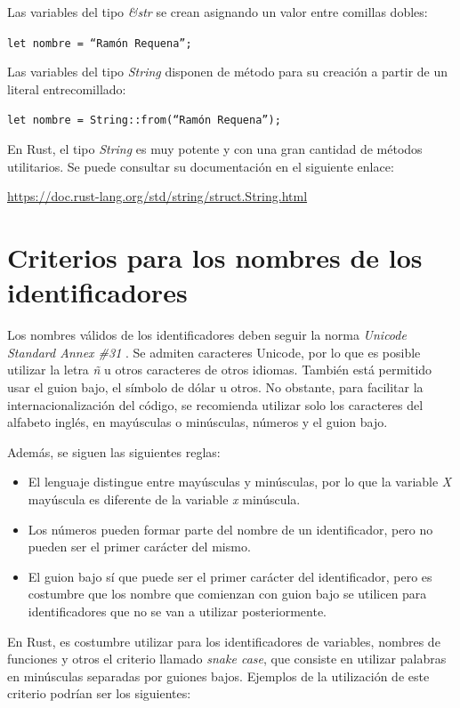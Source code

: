Las variables del tipo \textit{\&str} se crean asignando un valor entre comillas dobles:

{\centering \texttt{let nombre = ``Ramón Requena'';} \par}

Las variables del tipo \textit{String} disponen de método para su creación a partir de un literal entrecomillado:

{\centering \texttt{let nombre = String::from(``Ramón Requena'');} \par}

En Rust, el tipo \textit{String} es muy potente y con una gran cantidad de métodos utilitarios. Se puede consultar su documentación en el siguiente enlace:

{\centering \small \url{https://doc.rust-lang.org/std/string/struct.String.html} \par}

\section{Criterios para los nombres de los identificadores}
Los nombres válidos de los identificadores deben seguir la norma \textit{Unicode Standard Annex \#31} \citep{UAX31Unicode}. Se admiten caracteres Unicode, por lo que es posible utilizar la letra \textit{ñ} u otros caracteres de otros idiomas. También está permitido usar el guion bajo, el símbolo de dólar u otros. No obstante, para facilitar la internacionalización del código, se recomienda utilizar solo los caracteres del alfabeto inglés, en mayúsculas o minúsculas, números y el guion bajo. 

Además, se siguen las siguientes reglas:

\begin{itemize}
   \item El lenguaje distingue entre mayúsculas y minúsculas, por lo que la variable \textit{X} mayúscula es diferente de la variable \textit{x} minúscula.
   \item Los números pueden formar parte del nombre de un identificador, pero no pueden ser el primer carácter del mismo.
   \item El guion bajo sí que puede ser el primer carácter del identificador, pero es costumbre que los nombre que comienzan con guion bajo se utilicen para identificadores que no se van a utilizar posteriormente.
\end{itemize}

En Rust, es costumbre utilizar para los identificadores de variables, nombres de funciones y otros el criterio llamado \textit{snake case}, que consiste en utilizar palabras en minúsculas separadas por guiones bajos. Ejemplos de la utilización de este criterio podrían ser los siguientes:

